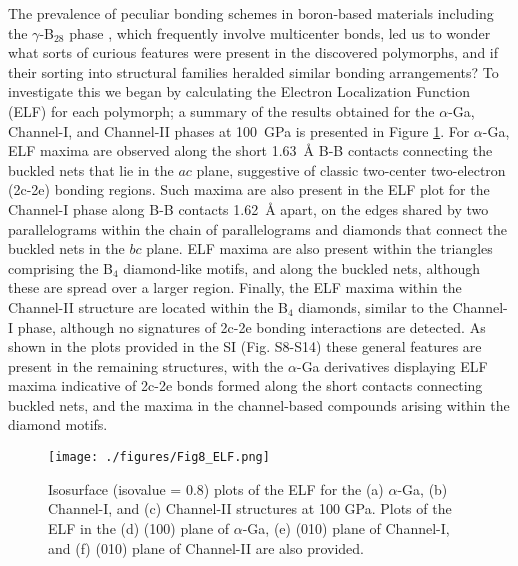 \documentclass[reprint,aps,prl,twocolumn,letterpaper]{revtex4-2}
\newlength{\figurewidth}
\begin{document}
The prevalence of peculiar bonding schemes in boron-based materials \cite{Longuet-Higgings:1955,vonSchnering:1991,Prasad:2005,Jemmis:2001,Fujimori:1999,Wade:1976,Mingos:1984} including the $\gamma$-B$_{28}$ phase \cite{Haussermann:2010,Mondal:2011,Oganov:2009}, which frequently involve multicenter bonds, led us to wonder what sorts of curious features were present in the discovered polymorphs, and if their sorting into structural families heralded similar bonding arrangements? To investigate this we began by calculating the Electron Localization Function (ELF) for each polymorph; a summary of the results obtained for the $\alpha$-Ga, Channel-I, and Channel-II phases at 100~GPa is presented in Figure \ref{fig:Fig8_ELF.png}. For $\alpha$-Ga, ELF maxima are observed along the short 1.63~\AA{} B-B contacts connecting the buckled nets that lie in the $ac$ plane, suggestive of classic two-center two-electron (2c-2e) bonding regions. Such maxima are also present in the ELF plot for the Channel-I phase along B-B contacts 1.62~\AA{} apart, on the edges shared by two parallelograms within the chain of parallelograms and diamonds that connect the buckled nets in the $bc$ plane. ELF maxima are also present within the triangles comprising the B$_4$ diamond-like motifs, and along the buckled nets, although these are spread over a larger region. Finally, the ELF maxima within the Channel-II structure are located within the B$_{4}$ diamonds, similar to the Channel-I phase, although no signatures of 2c-2e bonding interactions are detected. As shown in the plots provided in the SI (Fig. S8-S14) these general features are present in the remaining structures, with the $\alpha$-Ga derivatives displaying ELF maxima indicative of 2c-2e bonds formed along the short contacts connecting buckled nets, and the maxima in the channel-based compounds arising within the diamond motifs. 

\begin{figure}
\begin{center}
\texttt{[image: ./figures/Fig8\_ELF.png]}
\end{center}
\caption{Isosurface (isovalue = 0.8) plots of the ELF for the (a) $\alpha$-Ga, (b) Channel-I, and (c) Channel-II structures at 100 GPa. Plots of the ELF in the (d) (100) plane of $\alpha$-Ga, (e) (010) plane of Channel-I, and (f) (010) plane of Channel-II are also provided.
\label{fig:Fig8_ELF.png}}
\end{figure}
\end{document}
